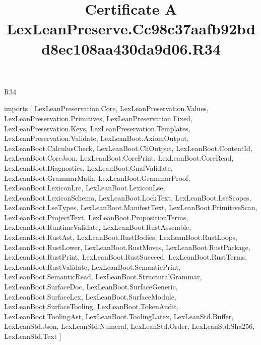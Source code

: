 \begin{lexlean}{R34}
\title{Certificate A LexLeanPreserve.Cc98c37aafb92bdd8ec108aa430da9d06.R34}
\begin{coremodule}
imports [
  LexLeanPreservation.Core,
  LexLeanPreservation.Values,
  LexLeanPreservation.Primitives,
  LexLeanPreservation.Fixed,
  LexLeanPreservation.Keys,
  LexLeanPreservation.Templates,
  LexLeanPreservation.Validate,
  LexLeanBoot.AxiomOutput,
  LexLeanBoot.CalculusCheck,
  LexLeanBoot.CliOutput,
  LexLeanBoot.ContentId,
  LexLeanBoot.CoreJson,
  LexLeanBoot.CorePrint,
  LexLeanBoot.CoreRead,
  LexLeanBoot.Diagnostics,
  LexLeanBoot.GnafValidate,
  LexLeanBoot.GrammarMath,
  LexLeanBoot.GrammarProof,
  LexLeanBoot.LexiconLre,
  LexLeanBoot.LexiconLse,
  LexLeanBoot.LexiconSchema,
  LexLeanBoot.LockText,
  LexLeanBoot.LseScopes,
  LexLeanBoot.LseTypes,
  LexLeanBoot.ManifestText,
  LexLeanBoot.PrimitiveScan,
  LexLeanBoot.ProjectText,
  LexLeanBoot.PropositionTerms,
  LexLeanBoot.RuntimeValidate,
  LexLeanBoot.RustAssemble,
  LexLeanBoot.RustAst,
  LexLeanBoot.RustBodies,
  LexLeanBoot.RustLoops,
  LexLeanBoot.RustLower,
  LexLeanBoot.RustMoves,
  LexLeanBoot.RustPackage,
  LexLeanBoot.RustPrint,
  LexLeanBoot.RustSucceed,
  LexLeanBoot.RustTerms,
  LexLeanBoot.RustValidate,
  LexLeanBoot.SemanticPrint,
  LexLeanBoot.SemanticRead,
  LexLeanBoot.StructuralGrammar,
  LexLeanBoot.SurfaceDoc,
  LexLeanBoot.SurfaceGeneric,
  LexLeanBoot.SurfaceLex,
  LexLeanBoot.SurfaceModule,
  LexLeanBoot.SurfaceTooling,
  LexLeanBoot.TokenAudit,
  LexLeanBoot.ToolingAst,
  LexLeanBoot.ToolingLatex,
  LexLeanStd.Buffer,
  LexLeanStd.Json,
  LexLeanStd.Numeral,
  LexLeanStd.Order,
  LexLeanStd.Sha256,
  LexLeanStd.Text
]


\end{coremodule}
\end{lexlean}
